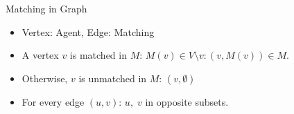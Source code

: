 \documentclass{beamer}
\begin{document}
\begin{frame}{Matching in Graph}
	\begin{description}[leftmargin=!,labelwidth=\widthof{\bfseries strict preference order}]
		\item [\emph{Unweighted Graphs in Matching}]
	\end{description}
				\begin{itemize}
					\item Vertex: Agent, Edge: Matching
					\item  A vertex $v$ is matched in $M$: $M(v) \in V \setminus{v} : (v, M(v))\in M$. 
					\item  Otherwise, $v$ is unmatched in $M$: $(v, \emptyset)$
				\end{itemize}
	\begin{description}[leftmargin=!,labelwidth=\widthof{\bfseries strict preference order}]
		\item [\emph{Bipartite Graph}] 
	\end{description}
	\begin{itemize}
		\item For every edge $(u,v)$:  $u, \;v$ in opposite subsets.
	\end{itemize}
\end{frame}


\end{document}
